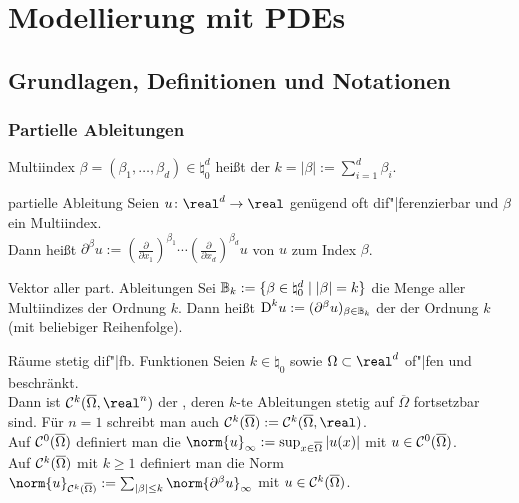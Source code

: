 \section{%
    Modellierung mit PDEs%
}

\subsection{%
    Grundlagen, Definitionen und Notationen%
}

\subsubsection{%
    Partielle Ableitungen%
}

\begin{Def}{Multiindex}
    $\beta = (\beta_1, \dotsc, \beta_d) \in \natural_0^d$ heißt  der
     $k = |\beta| := \sum_{i=1}^d \beta_i$.
\end{Def}

\begin{Def}{partielle Ableitung}
    Seien $u\colon \real^d \to \real$ genügend oft dif"|ferenzierbar und $\beta$ ein Multiindex.\\
    Dann heißt $\partial^\beta u := (\frac{\partial}{\partial x_1})^{\beta_1} \dotsm
    (\frac{\partial}{\partial x_d})^{\beta_d} u$  von $u$
    zum Index $\beta$.
\end{Def}

\begin{Def}{Vektor aller part. Ableitungen}
    Sei $\mathbb{B}_k := \{\beta \in \natural_0^d \;|\; |\beta| = k\}$ die Menge aller Multiindizes
    der Ordnung $k$.
    Dann heißt $\text{D}^k u := (\partial^\beta u)_{\beta \in \mathbb{B}_k}$ der
     der Ordnung $k$
    (mit beliebiger Reihenfolge).
\end{Def}

\begin{Def}{Räume stetig dif"|fb. Funktionen}
    Seien $k \in \natural_0$ sowie $\Omega \subset \real^d$ of"|fen und beschränkt.\\
    Dann ist $\C^k(\overline{\Omega}, \real^n)$ der
    ,
    deren $k$-te Ableitungen stetig auf $\overline{\Omega}$ fortsetzbar sind.
    Für $n = 1$ schreibt man auch $\C^k(\overline{\Omega}) := \C^k(\overline{\Omega}, \real)$.\\
    Auf $\mathcal{C}^0(\overline{\Omega})$ definiert man die 
    $\norm{u}_\infty := \sup_{x \in \overline{\Omega}} |u(x)|$ mit
    $u \in \mathcal{C}^0(\overline{\Omega})$.\\
    Auf $\mathcal{C}^k(\overline{\Omega})$ mit $k \ge 1$ definiert man die Norm
    $\norm{u}_{\C^k(\overline{\Omega})} := \sum_{|\beta| \le k} \norm{\partial^\beta u}_\infty$ mit
    $u \in \mathcal{C}^k(\overline{\Omega})$.
\end{Def}

